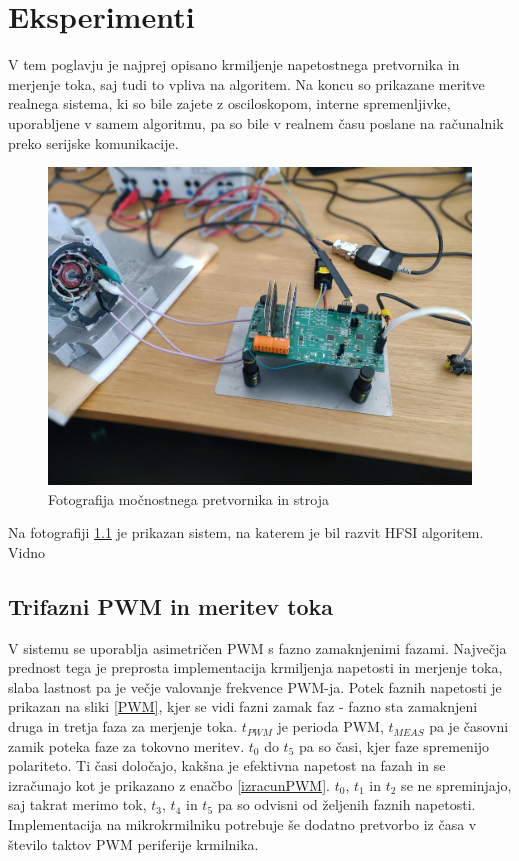 \documentclass[a4paper,twoside,openright,12pt,slovene]{book}
\begin{document}
\chapter{Eksperimenti}  \label{eksperimenti}

V tem poglavju je najprej opisano krmiljenje napetostnega pretvornika in merjenje toka, saj tudi to vpliva na algoritem. Na koncu so prikazane meritve realnega sistema, ki so bile zajete z
osciloskopom, interne spremenljivke, uporabljene v samem algoritmu, pa so bile v realnem času poslane na računalnik preko serijske komunikacije.

\begin{figure}[!htbp]
    \centering
    \includegraphics[width=0.75\columnwidth]{Slike/EksperimentiSlika.jpg}
    \caption{\label{experimentiSlika} Fotografija močnostnega pretvornika in stroja}
\end{figure}

Na fotografiji \ref{experimentiSlika} je prikazan sistem, na katerem je bil razvit HFSI algoritem. Vidno

\section{Trifazni PWM in meritev toka}

V sistemu se uporablja asimetričen PWM s fazno zamaknjenimi fazami. Največja prednost tega je preprosta implementacija krmiljenja napetosti in merjenje toka, slaba lastnost pa je večje valovanje
frekvence PWM-ja. Potek faznih napetosti je prikazan na sliki \ref{PWM}, kjer se vidi fazni zamak faz - fazno sta zamaknjeni druga in tretja faza za merjenje toka. $t_{PWM}$ je perioda PWM, $t_{MEAS}$
pa je časovni zamik poteka faze za tokovno meritev. $t_0$ do $t_5$ pa so časi, kjer faze spremenijo polariteto. Ti časi določajo, kakšna je efektivna napetost na fazah in se izračunajo kot je
prikazano z enačbo \ref{izracunPWM}. $t_0$, $t_1$ in $t_2$ se ne spreminjajo, saj takrat merimo tok, $t_3$, $t_4$ in $t_5$ pa so odvisni od željenih faznih napetosti. Implementacija na mikrokrmilniku
potrebuje še dodatno pretvorbo iz časa v število taktov PWM periferije krmilnika.
\end{document}
